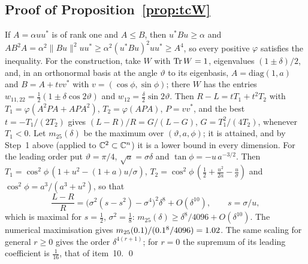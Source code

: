 \subsection*{Proof of Proposition~\ref{prop:tcW}}
If $A=\alpha uu^*$ is of rank one and $A\le B$, then $u^*Bu\ge\alpha$ and $AB^2A=\alpha^2\|Bu\|^2uu^*\ge\alpha^2(u^*Bu)^2
uu^*\ge A^4$, so every positive $\varphi$ satisfies the inequality. For the construction, take $W$ with $\operatorname{Tr} W=1$,
eigenvalues $(1\pm\delta)/2$, and, in an orthonormal basis at the angle $\vartheta$ to its eigenbasis,
$A=\mathrm{diag}(1,a)$ and $B=A+tvv^*$ with $v=(\cos\phi,\sin\phi)$; there $W$ has the entries
$w_{11,22}=\frac12(1\pm\delta\cos2\vartheta)$ and $w_{12}=\frac\delta2\sin2\vartheta$. Then $R-L=tT_1+t^2T_2$ with
$T_1=\varphi(A^2PA+APA^2)$, $T_2=\varphi(APA)$, $P=vv^*$, and the best $t=-T_1/(2T_2)$ gives $(L-R)/R=G/(L-G)$,
$G=T_1^2/(4T_2)$, whenever $T_1<0$. Let $m_{25}(\delta)$ be the maximum over $(\vartheta,a,\phi)$; it is attained,
and by Step~1 above (applied to $\mathbb{C}^2\subset\mathbb{C}^n$) it is a lower bound in every dimension. For the leading order put
$\vartheta=\pi/4$, $\sqrt a=\sigma\delta$ and $\tan\phi=-u\,a^{-3/2}$. Then
$T_1=\cos^2\phi\,(1+u^2-(1+a)u/\sigma)$, $T_2=\cos^2\phi\,(\frac12+\frac{u^2}{2a}-\frac u\sigma)$ and
$\cos^2\phi=a^3/(a^3+u^2)$, so that
\[
\frac{L-R}R=\bigl(\sigma^2(s-s^2)-\sigma^4\bigr)^2\delta^8+O(\delta^{10}),\qquad s=\sigma/u,
\]
which is maximal for $s=\frac12$, $\sigma^2=\frac18$: $m_{25}(\delta)\ge\delta^8/4096+O(\delta^{10})$. The numerical
maximisation gives $m_{25}(0.1)/(0.1^8/4096)=\IfFileExists{generated/trace_characterizations.tex}{\TCWmonLead}{1.02}$.
The same scaling for general $r\ge0$ gives the order $\delta^{4(r+1)}$; for $r=0$ the supremum of its leading
coefficient is $\frac1{16}$, that of item~10. \qed

